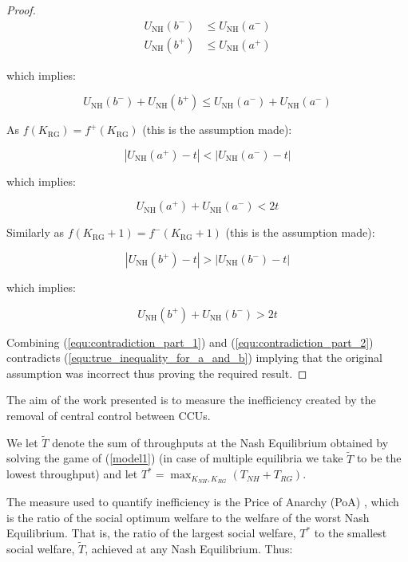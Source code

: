 \documentclass{article}
\newcommand{\NH}{\text{NH}}
\newcommand{\RG}{\text{RG}}
\begin{document}
\begin{proof}
\begin{align}
U_{\NH}(b^-)&\leq U_{\NH}(a^-)\\
U_{\NH}(b^+)&\leq U_{\NH}(a^+)
\end{align}

which implies:

\begin{equation}
U_{\NH}(b^-) +  U_{\NH}(b^+) \leq U_{\NH}(a^-) + U_{\NH}(a^-)
\label{equ:true_inequality_for_a_and_b}
\end{equation}

As \(f(K_{\RG})=f^{+}(K_{\RG})\) (this is the assumption made):

\begin{equation}
|U_{\NH}(a^+)-t|<|U_{\NH}(a^-)-t|
\end{equation}

which implies:

\begin{equation}
U_{\NH}(a^+)+U_{\NH}(a^-)<2t
\label{equ:contradiction_part_1}
\end{equation}

Similarly as \(f(K_{\RG}+1)=f^{-}(K_{\RG}+1)\) (this is the assumption made):

\begin{equation}
|U_{\NH}(b^+)-t|>|U_{\NH}(b^-)-t|
\end{equation}

which implies:

\begin{equation}
U_{\NH}(b^+)+U_{\NH}(b^-)>2t
\label{equ:contradiction_part_2}
\end{equation}

Combining (\ref{equ:contradiction_part_1}) and (\ref{equ:contradiction_part_2}) contradicts (\ref{equ:true_inequality_for_a_and_b}) implying that the original assumption was incorrect thus proving the required result.
\end{proof}

The aim of the work presented is to measure the inefficiency created by the removal of central control between CCUs.

We let $\widetilde T$ denote the sum of throughputs at the Nash Equilibrium obtained by solving the game of (\ref{model1}) (in case of multiple equilibria we take $\widetilde T$ to be the lowest throughput) and let $T^*=\max_{K_{NH}, K_{RG}}\left(T_{NH}+T_{RG}\right)$.

The measure used to quantify inefficiency is the Price of Anarchy (PoA) \cite{Koutsoupias1999,TimRoughgarden}, which is the ratio of the social optimum welfare to the welfare of the worst Nash Equilibrium.
That is, the ratio of the largest social welfare, $T^*$ to the smallest social welfare, $\widetilde{T}$, achieved at any Nash Equilibrium. Thus:
\end{document}
